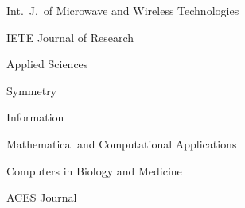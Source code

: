 \begin{cvlist}[2]
    \item Int.\ J.\ of Microwave and Wireless Technologies~
    \item IETE Journal of Research~
    \item Applied Sciences~
    \item Symmetry~
    \item Information~
    \item Mathematical and Computational Applications~
    \item Computers in Biology and Medicine~
    \item ACES Journal~
\end{cvlist}
